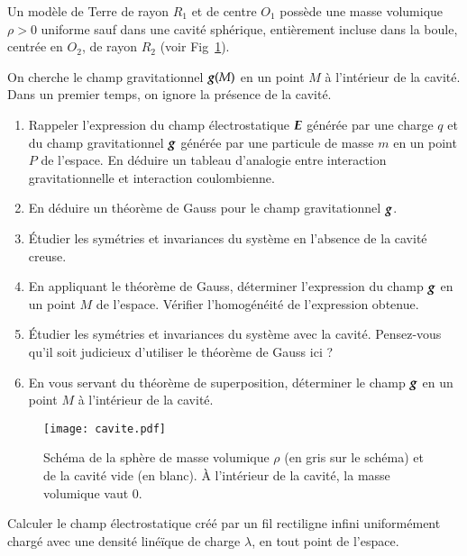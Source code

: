 \begin{exocor}
Un modèle de Terre de rayon $R_1$ et de centre $O_1$ possède une masse volumique 
$\rho>0$ uniforme sauf dans une cavité sphérique, 
entièrement incluse dans la boule, centrée en $O_2$, de rayon $R_2$
(voir Fig~\ref{fig:cavite}). 

On cherche le champ gravitationnel $\vecg(M)$ en un point $M$ 
à l'intérieur de la cavité.
Dans un premier temps, on ignore la présence de la cavité.
\begin{enumerate}
	\item Rappeler l'expression du champ électrostatique $\vece$ générée par une
	  charge $q$ et du champ gravitationnel $\vecg$ générée par une particule
	  de masse $m$ en un point $P$ de l'espace. 
	  En déduire un tableau d'analogie entre interaction
	  gravitationnelle et interaction coulombienne.
  	\item En déduire un théorème de Gauss pour le champ gravitationnel
	  $\vecg$.
	\item Étudier les symétries et invariances du système en l'absence de
	  la cavité creuse.
	\item En appliquant le théorème de Gauss, déterminer l'expression
	  du champ $\vecg$ en un point $M$ de l'espace.
	  Vérifier l'homogénéité de l'expression obtenue.
	\item Étudier les symétries et invariances du système avec la cavité.
	  Pensez-vous qu'il soit judicieux d'utiliser le théorème de Gauss
	  ici ?
	\item En vous servant du théorème de superposition, 
	  déterminer le champ $\vecg$ en un point $M$ à l'intérieur de la cavité.
\end{enumerate}
\end{exocor}
\begin{figure}[h!]
\centering
\texttt{[image: cavite.pdf]}
\caption{Schéma de la sphère de masse volumique $\rho$ (en gris sur le schéma) 
	 et de la cavité vide (en blanc).
         À l'intérieur de la cavité, la masse volumique vaut 0.}
\label{fig:cavite}
\end{figure}

\begin{exocor}
	Calculer le champ électrostatique créé par un fil rectiligne infini
	uniformément chargé avec une densité linéïque de charge $\lambda$, en 
	tout point de l'espace.
\end{exocor}

\newpage
